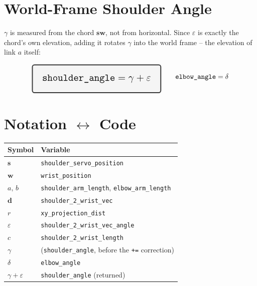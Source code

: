 \documentclass[11pt,a4paper]{article}
\begin{document}
\section{World-Frame Shoulder Angle}

$\gamma$ is measured from the chord $\mathbf s\mathbf w$, not from horizontal. Since
$\varepsilon$ is exactly the chord's own elevation, adding it rotates $\gamma$ into the world
frame -- the elevation of link $a$ itself:

\begin{equation}
\raisebox{-0.5\height}{\tikz \node[draw=gray!45!black, line width=1.4pt, rounded corners=3pt,
fill=gray!8, inner sep=14pt]
{\Large $\displaystyle \texttt{shoulder\_angle} = \gamma + \varepsilon$};}
\qquad
\texttt{elbow\_angle} = \delta
\end{equation}

\section{Notation $\leftrightarrow$ Code}

\begin{center}
\begin{tabular}{@{}ll@{}}
\toprule
Symbol & Variable \\
\midrule
$\mathbf s$ & \texttt{shoulder\_servo\_position} \\
$\mathbf w$ & \texttt{wrist\_position} \\
$a,\,b$ & \texttt{shoulder\_arm\_length}, \texttt{elbow\_arm\_length} \\
$\mathbf d$ & \texttt{shoulder\_2\_wrist\_vec} \\
$r$ & \texttt{xy\_projection\_dist} \\
$\varepsilon$ & \texttt{shoulder\_2\_wrist\_vec\_angle} \\
$c$ & \texttt{shoulder\_2\_wrist\_length} \\
$\gamma$ & (\texttt{shoulder\_angle}, before the \texttt{+=} correction) \\
$\delta$ & \texttt{elbow\_angle} \\
$\gamma+\varepsilon$ & \texttt{shoulder\_angle} (returned) \\
\bottomrule
\end{tabular}
\end{center}
\end{document}
